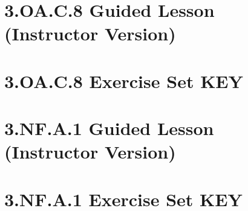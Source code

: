 \documentclass[a4paper,12pt]{article}
\begin{document}
\newpage
\section{3.OA.C.8 Guided Lesson (Instructor Version)}


\newpage
\section{3.OA.C.8 Exercise Set KEY }


\newpage
\section{3.NF.A.1 Guided Lesson (Instructor Version)}


\newpage
\section{3.NF.A.1 Exercise Set KEY }

\end{document}
